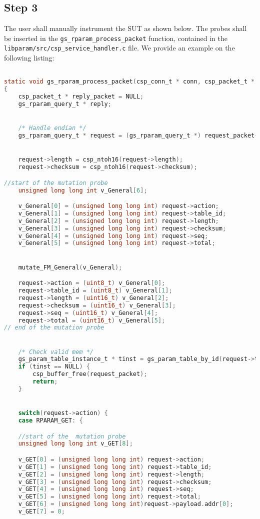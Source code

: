 \subsection{Step 3}

The user shall manually instrument the SUT as shown below.
The probes shall be inserted in the \texttt{gs\_rparam\_process\_packet} function, contained in the \texttt{libparam/src/csp\_service\_handler.c} file. We provide an example on the following listing:

\begin{lstlisting}[language=c]

static void gs_rparam_process_packet(csp_conn_t * conn, csp_packet_t * request_packet)
{
    csp_packet_t * reply_packet = NULL;
    gs_rparam_query_t * reply;


    /* Handle endian */
    gs_rparam_query_t * request = (gs_rparam_query_t *) request_packet->data;


    request->length = csp_ntoh16(request->length);
    request->checksum = csp_ntoh16(request->checksum);

//start of the mutation probe
    unsigned long long int v_General[6];

    v_General[0] = (unsigned long long int) request->action;
    v_General[1] = (unsigned long long int) request->table_id;
    v_General[2] = (unsigned long long int) request->length;
    v_General[3] = (unsigned long long int) request->checksum;
    v_General[4] = (unsigned long long int) request->seq;
    v_General[5] = (unsigned long long int) request->total;


    mutate_FM_General(v_General);

    request->action = (uint8_t) v_General[0];
    request->table_id = (uint8_t) v_General[1];
    request->length = (uint16_t) v_General[2];
    request->checksum = (uint16_t) v_General[3];
    request->seq = (uint16_t) v_General[4];
    request->total = (uint16_t) v_General[5];
// end of the mutation probe


    /* Check valid mem */
    gs_param_table_instance_t * tinst = gs_param_table_by_id(request->table_id);
    if (tinst == NULL) {
        csp_buffer_free(request_packet);
        return;
    }


    switch(request->action) {
	case RPARAM_GET: {

    //start of the  mutation probe
    unsigned long long int v_GET[8];

    v_GET[0] = (unsigned long long int) request->action;
    v_GET[1] = (unsigned long long int) request->table_id;
    v_GET[2] = (unsigned long long int) request->length;
    v_GET[3] = (unsigned long long int) request->checksum;
    v_GET[4] = (unsigned long long int) request->seq;
    v_GET[5] = (unsigned long long int) request->total;
    v_GET[6] = (unsigned long long int)request->payload.addr[0];
    v_GET[7] = 0;


\end{lstlisting}
